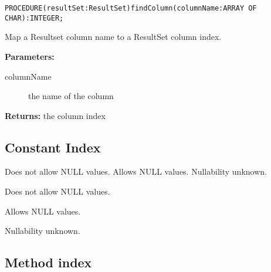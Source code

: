 
\verb'PROCEDURE(resultSet:ResultSet)findColumn(columnName:ARRAY OF CHAR):INTEGER;'

     Map a Resultset column name to a ResultSet column index. 

     {\bf Parameters: } 
\begin{description}
\item[columnName] the name of the column 
\end{description}

     {\bf Returns: } 
          the column index 


\renewcommand{\CurClass}{ResultSetMetaData}
\Class{}
 
\subsection{Constant Index}

\begin{description}
  Does not allow NULL values. 
  Allows NULL values. 
  Nullability unknown. 
\end{description}

  Does not allow NULL values. 

  Allows NULL values. 

  Nullability unknown. 


\subsection{Method index}

